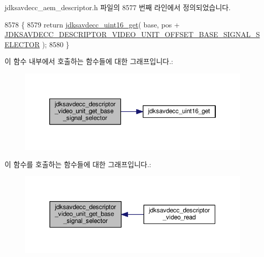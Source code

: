 jdksavdecc\+\_\+aem\+\_\+descriptor.\+h 파일의 8577 번째 라인에서 정의되었습니다.


\begin{DoxyCode}
8578 \{
8579     \textcolor{keywordflow}{return} \hyperlink{group__endian_ga3fbbbc20be954aa61e039872965b0dc9}{jdksavdecc\_uint16\_get}( base, pos + 
      \hyperlink{group__descriptor__video_ga4b387d079f7f1d15f21c6d3047ee4723}{JDKSAVDECC\_DESCRIPTOR\_VIDEO\_UNIT\_OFFSET\_BASE\_SIGNAL\_SELECTOR}
       );
8580 \}
\end{DoxyCode}


이 함수 내부에서 호출하는 함수들에 대한 그래프입니다.\+:
\nopagebreak
\begin{figure}[H]
\begin{center}
\leavevmode
\includegraphics[width=346pt]{group__descriptor__video_gaa9aff78be73fafa61f37b5b23f880d9c_cgraph}
\end{center}
\end{figure}




이 함수를 호출하는 함수들에 대한 그래프입니다.\+:
\nopagebreak
\begin{figure}[H]
\begin{center}
\leavevmode
\includegraphics[width=344pt]{group__descriptor__video_gaa9aff78be73fafa61f37b5b23f880d9c_icgraph}
\end{center}
\end{figure}


